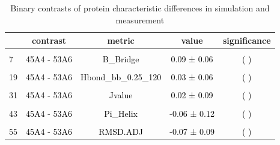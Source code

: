 \documentclass{article}\usepackage[table]{xcolor}
\renewcommand{\$}{$} %
\begin{document}
\begin{center}

\begin{longtable}[t]{lcccc}
\caption{\label{tab:unnamed-chunk-19}Binary contrasts of protein characteristic differences in simulation and measurement}\\
\toprule
  & contrast & metric & value & significance\\
\midrule
\cellcolor{gray!6}{1} & \cellcolor{gray!6}{\textcolor{blue}{45A4 - 53A6}} & \cellcolor{gray!6}{\textcolor{blue}{A\_Helix}} & \cellcolor{gray!6}{\textcolor{blue}{0.36 ± 0.09}} & \cellcolor{gray!6}{\textcolor{black}{(***)}}\\
7 & \textcolor{black}{45A4 - 53A6} & \textcolor{black}{B\_Bridge} & \textcolor{black}{0.09 ± 0.06} & \textcolor{black}{( )}\\
\cellcolor{gray!6}{13} & \cellcolor{gray!6}{\textcolor{black}{45A4 - 53A6}} & \cellcolor{gray!6}{\textcolor{black}{B\_Strand}} & \cellcolor{gray!6}{\textcolor{black}{-0.13 ± 0.09}} & \cellcolor{gray!6}{\textcolor{black}{( )}}\\
19 & \textcolor{black}{45A4 - 53A6} & \textcolor{black}{Hbond\_bb\_0.25\_120} & \textcolor{black}{0.03 ± 0.06} & \textcolor{black}{( )}\\
\cellcolor{gray!6}{25} & \cellcolor{gray!6}{\textcolor{blue}{45A4 - 53A6}} & \cellcolor{gray!6}{\textcolor{blue}{Hbond\_native\_bb\_0.25\_120}} & \cellcolor{gray!6}{\textcolor{blue}{-0.31 ± 0.08}} & \cellcolor{gray!6}{\textcolor{black}{(**)}}\\
31 & \textcolor{black}{45A4 - 53A6} & \textcolor{black}{Jvalue} & \textcolor{black}{0.02 ± 0.09} & \textcolor{black}{( )}\\
\cellcolor{gray!6}{37} & \cellcolor{gray!6}{\textcolor{black}{45A4 - 53A6}} & \cellcolor{gray!6}{\textcolor{black}{NOE\_repl\_merged}} & \cellcolor{gray!6}{\textcolor{black}{-0.05 ± 0.05}} & \cellcolor{gray!6}{\textcolor{black}{( )}}\\
43 & \textcolor{black}{45A4 - 53A6} & \textcolor{black}{Pi\_Helix} & \textcolor{black}{-0.06 ± 0.12} & \textcolor{black}{( )}\\
\cellcolor{gray!6}{49} & \cellcolor{gray!6}{\textcolor{blue}{45A4 - 53A6}} & \cellcolor{gray!6}{\textcolor{blue}{Rgyr}} & \cellcolor{gray!6}{\textcolor{blue}{-0.02 ± 0.00}} & \cellcolor{gray!6}{\textcolor{black}{(***)}}\\
55 & \textcolor{black}{45A4 - 53A6} & \textcolor{black}{RMSD.ADJ} & \textcolor{black}{-0.07 ± 0.09} & \textcolor{black}{( )}\\

\end{longtable}
\end{center}
\end{document}
